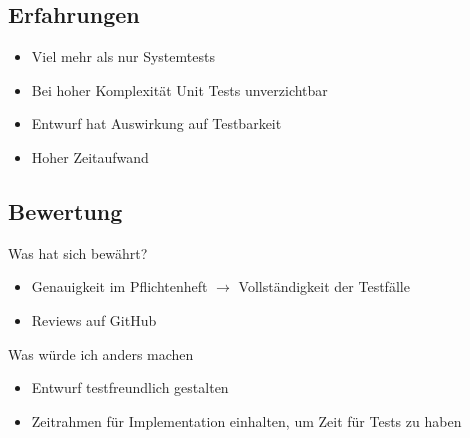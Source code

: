 \documentclass{beamer}
\begin{document}
  \subsection{Erfahrungen}
  \begin{frame}{\subsecname}
    \begin{itemize}
      \item Viel mehr als nur Systemtests
      \item Bei hoher Komplexität Unit Tests unverzichtbar
      \item Entwurf hat Auswirkung auf Testbarkeit
      \item Hoher Zeitaufwand
    \end{itemize}
  \end{frame}

  \subsection{Bewertung}
  \begin{frame}{\subsecname}
      \begin{block}{Was hat sich bewährt?}
        \begin{itemize}
          \item Genauigkeit im Pflichtenheft $\to$ Vollständigkeit der Testfälle
          \item Reviews auf GitHub
        \end{itemize}
      \end{block}

      \begin{block}{Was würde ich anders machen}
        \begin{itemize}
          \item Entwurf testfreundlich gestalten
          \item Zeitrahmen für Implementation einhalten, um Zeit für Tests zu haben
        \end{itemize}
      \end{block}
  \end{frame}
\end{document}
